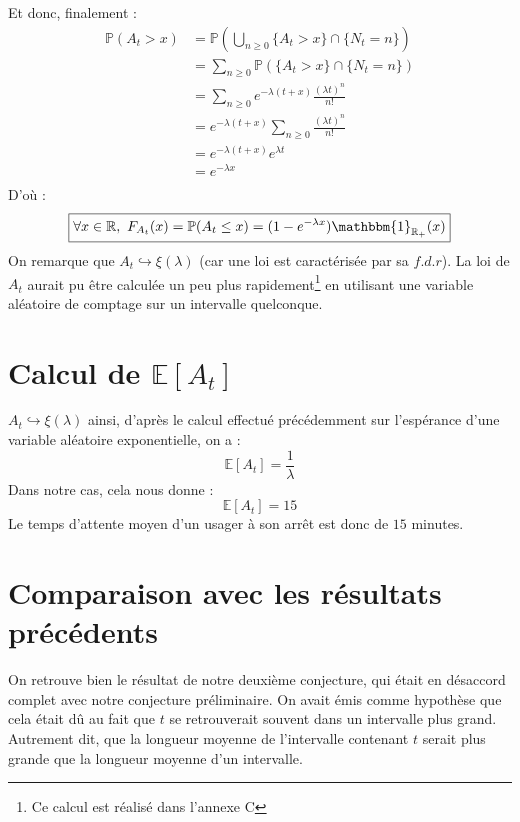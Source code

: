 \documentclass[a4paper, titlepage]{livret} %
\begin{document}
			Et donc, finalement :
			\[\begin{aligned}
				\mathbb{P}(A_{t} > x) & = \mathbb{P}\left(\bigcup_{n \geq 0} \{A_{t} > x\} \cap \{N_{t} = n\}\right)\\
									  & = \sum_{n \geq 0} \mathbb{P}(\{A_{t} > x\} \cap \{N_{t} = n\})\\
									  & = \sum_{n \geq 0} e^{-\lambda (t + x)}\frac{(\lambda t)^{n}}{n!}\\
									  & = e^{-\lambda (t + x)}\sum_{n \geq 0}\frac{(\lambda t)^{n}}{n!}\\
									  & = e^{-\lambda (t + x)}e^{\lambda t}\\
									  & = e^{-\lambda x}\\
			\end{aligned}\]
			D'où :
			\[\boxed{
				\forall x \in \mathbb{R}, \ F_{A_{t}}(x) = \mathbb{P}(A_{t} \leq x) = (1 - e^{-\lambda x})\mathbbm{1}_{\mathbb{R}_{+}}(x)
			}\]
			On remarque que $A_{t} \hookrightarrow \xi(\lambda)$ (car une loi est caractérisée par sa $f.d.r$).
			La loi de $A_{t}$ aurait pu être calculée un peu plus rapidement\footnote{Ce calcul est réalisé dans l'annexe C} en utilisant une variable aléatoire de comptage sur un intervalle quelconque.
		
		\section{Calcul de $\mathbb{E}[A_{t}]$}
			$A_{t} \hookrightarrow \xi(\lambda)$ ainsi, d'après le calcul effectué précédemment sur l'espérance d'une variable aléatoire exponentielle, on a : 
			\[\boxed{
				\mathbb{E}[A_{t}] = \frac{1}{\lambda}
			}\]
			Dans notre cas, cela nous donne : 
			\[\boxed{
				\mathbb{E}[A_{t}] = 15
			}\]
			Le temps d'attente moyen d'un usager à son arrêt est donc de $15$ minutes.

		\section{Comparaison avec les résultats précédents}
			On retrouve bien le résultat de notre deuxième conjecture, qui était en désaccord complet avec notre conjecture préliminaire.
			On avait émis comme hypothèse que cela était dû au fait que $t$ se retrouverait souvent dans un intervalle plus grand.
			Autrement dit, que la longueur moyenne de l'intervalle contenant $t$ serait plus grande que la longueur moyenne d'un intervalle.
\end{document}
